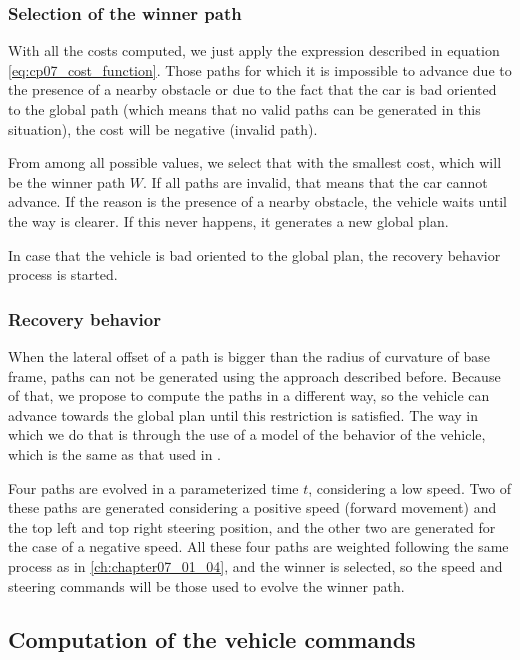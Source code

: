 \subsubsection{Selection of the winner path}\label{ch:chapter07_01_04_01}

With all the costs computed, we just apply the expression described in equation \ref{eq:cp07_cost_function}. Those paths for which it is impossible to advance due to the presence of a nearby obstacle or due to the fact that the car is bad oriented to the global path (which means that no valid paths can be generated in this situation), the cost will be negative (invalid path).

From among all possible values, we select that with the smallest cost, which will be the winner path $W$. If all paths are invalid, that means that the car cannot advance. If the reason is the presence of a nearby obstacle, the vehicle waits until the way is clearer. If this never happens, it generates a new global plan.

In case that the vehicle is bad oriented to the global plan, the recovery behavior process is started.

\subsubsection{Recovery behavior}\label{ch:chapter07_01_04_02}

When the lateral offset of a path is bigger than the radius of curvature of base frame, paths can not be generated using the approach described before. Because of that, we propose to compute the paths in a different way, so the vehicle can advance towards the global plan until this restriction is satisfied. The way in which we do that is through the use of a model of the behavior of the vehicle, which is the same as that used in .

Four paths are evolved in a parameterized time $t$, considering a low speed. Two of these paths are generated considering a positive speed (forward movement) and the top left and top right steering position, and the other two are generated for the case of a negative speed. All these four paths are weighted following the same process as in \ref{ch:chapter07_01_04}, and the winner is selected, so the speed and steering commands will be those used to evolve the winner path.

\subsection{Computation of the vehicle commands}\label{ch:chapter07_01_03}

